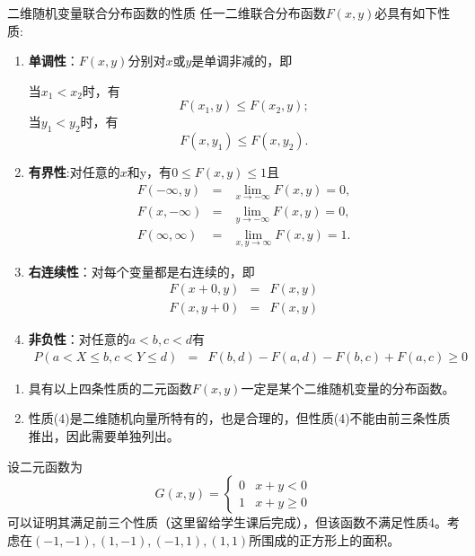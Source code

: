 \begin{theorem}{二维随机变量联合分布函数的性质}\label{thm: property_of_two_dim_rv}
任一二维联合分布函数$F(x,y)$必具有如下性质:
\begin{enumerate}
    \item \textbf{单调性}：$F(x,y)$分别对$x$或$y$是单调非减的，即
    
    当$x_{1}<x_{2}$时，有$$F\left(x_{1}, y\right) \leq F\left(x_{2}, y\right);$$
    当$y_{1}<y_{2}$时，有
    $$F\left(x, y_{1}\right) \leq F\left(x, y_{2}\right).$$
    \item \textbf{有界性}:对任意的$x$和y，有$0 \leqslant F(x, y) \leqslant 1$且
    \begin{eqnarray*}
        F(-\infty, y)&=&\lim _{x \rightarrow-\infty} F(x, y)=0, \\
F(x,-\infty)&=&\lim _{y \rightarrow-\infty} F(x, y)=0, \\
F(\infty, \infty)&=&\lim _{x, y \rightarrow \infty} F(x, y)=1.
    \end{eqnarray*}
    \item \textbf{右连续性}：对每个变量都是右连续的，即
    \begin{eqnarray*}
        F(x+0, y)&=&F(x, y) \\
F(x, y+0)&=&F(x, y)
    \end{eqnarray*}
    \item \textbf{非负性}：对任意的$a<b,c<d$有
    \begin{eqnarray*}
        P(a<X \leq b, c<Y \leqslant d) &=&F(b, d)-F(a, d)-F(b, c)+F(a, c)  \geqslant 0
    \end{eqnarray*}
\end{enumerate}
\end{theorem}

\begin{remark}
\begin{enumerate}
    \item 具有以上四条性质的二元函数$F(x,y)$一定是某个二维随机变量的分布函数。
    \item 性质(4)是二维随机向量所特有的，也是合理的，但性质(4)不能由前三条性质推出，因此需要单独列出。
\end{enumerate}
\end{remark}
\begin{example}
    设二元函数为
    $$G(x, y)=\left\{\begin{array}{ll}
0 & x+y<0 \\
1 & x+y \geqslant 0
\end{array}\right. $$
可以证明其满足前三个性质（这里留给学生课后完成），但该函数不满足性质4。考虑在$(-1,-1),(1,-1),(-1,1),(1,1)$所围成的正方形上的面积。
\end{example}
\begin{note}
   \vspace{5cm} 
\end{note}

